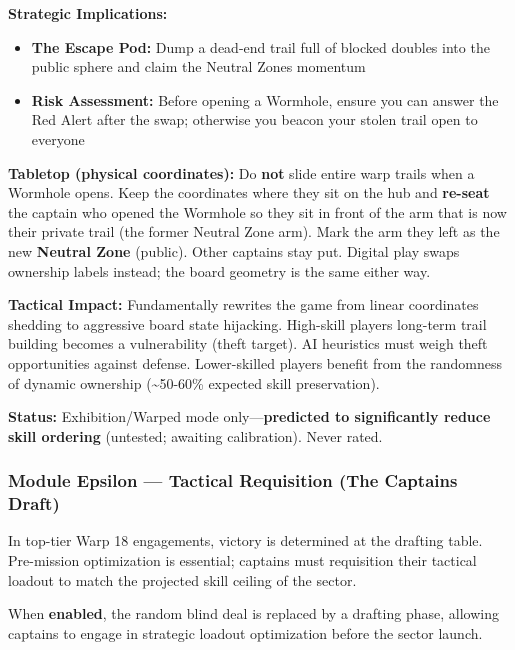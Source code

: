 \documentclass[11pt]{article}
\providecommand{\tightlist}{%
  \setlength{\itemsep}{0pt}\setlength{\parskip}{0pt}}
\begin{document}
\textbf{Strategic Implications:}

\begin{itemize}
\tightlist
\item
  \textbf{The Escape Pod:} Dump a dead-end trail full of blocked
  doubles into the public sphere and claim the Neutral Zone\textquotesingle s
  momentum
\item
  \textbf{Risk Assessment:} Before opening a Wormhole, ensure you can
  answer the Red Alert after the swap; otherwise you beacon your stolen
  trail open to everyone
\end{itemize}

\textbf{Tabletop (physical coordinates):} Do \textbf{not} slide entire
warp trails when a Wormhole opens. Keep the coordinates where
they sit on the hub and \textbf{re-seat} the captain who opened the
Wormhole so they sit in front of the arm that is now their private
trail (the former Neutral Zone arm). Mark the arm they left as the new
\textbf{Neutral Zone} (public). Other captains stay put. Digital play
swaps ownership labels instead; the board geometry is the same either
way.

\textbf{Tactical Impact:} Fundamentally rewrites the game from linear
coordinates shedding to aggressive board state hijacking. High-skill
players\textquotesingle{} long-term trail building becomes a
vulnerability (theft target). AI heuristics must weigh theft
opportunities against defense. Lower-skilled players benefit from the
randomness of dynamic ownership (\textasciitilde50-60\% expected skill
preservation).

\textbf{Status:} Exhibition/Warped mode only---\textbf{predicted to
significantly reduce skill ordering} (untested; awaiting calibration).
Never rated.

\subsubsection{Module Epsilon --- Tactical Requisition (The
Captain\textquotesingle s
Draft)}\label{module-epsilon--tactical-requisition-the-captains-draft}

In top-tier Warp 18 engagements, victory is determined at the drafting
table. Pre-mission optimization is essential; captains must requisition
their tactical loadout to match the projected skill ceiling of the
sector.

When \textbf{enabled}, the random blind deal is replaced by a drafting
phase, allowing captains to engage in strategic loadout optimization
before the sector launch.
\end{document}
